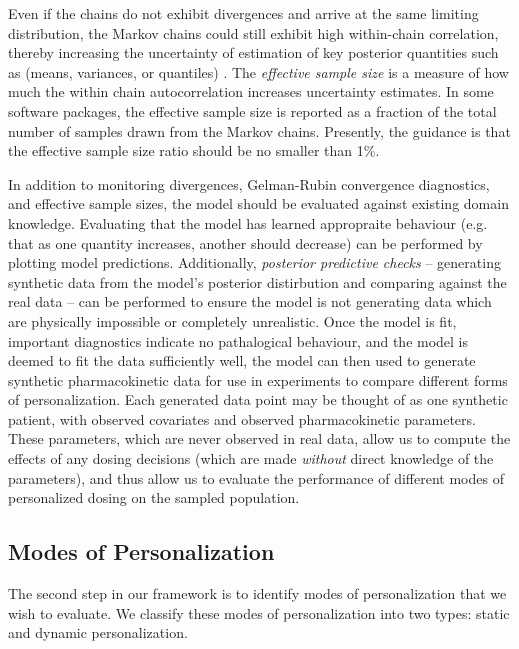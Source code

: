 Even if the chains do not exhibit divergences and arrive at the same limiting distribution, the Markov chains could still exhibit high within-chain correlation, thereby increasing the uncertainty of estimation of key posterior quantities such as (means, variances, or quantiles) \cite{brooks2011handbook}.  The \textit{effective sample size} is a measure of how much the within chain autocorrelation increases uncertainty estimates.  In some software packages, the effective sample size is reported as a fraction of the total number of samples drawn from the Markov chains.  Presently, the guidance is that the effective sample size ratio should be no smaller than 1\%.



In addition to monitoring divergences, Gelman-Rubin convergence diagnostics, and effective sample sizes, the model should be evaluated against existing domain knowledge.  Evaluating that the model has learned appropraite behaviour (e.g. that as one quantity increases, another should decrease) can be performed by plotting model predictions.  Additionally, \textit{posterior predictive checks} -- generating synthetic data  from the model's posterior distirbution and comparing against the real data -- can be performed to ensure the model is not generating data which are physically impossible or completely unrealistic. Once the model is fit, important diagnostics indicate no pathalogical behaviour, and the model is deemed to fit the data sufficiently well, the model can then used to generate synthetic pharmacokinetic data for use in experiments to compare different forms of personalization. Each generated data point may be thought of as one synthetic patient, with observed covariates and observed pharmacokinetic parameters. These parameters, which are never observed in real data, allow us to compute the effects of any dosing decisions (which are made \textit{without} direct knowledge of the parameters), and thus allow us to evaluate the performance of different modes of personalized dosing on the sampled population. 

\subsection{Modes of Personalization}

The second step in our framework is to identify modes of personalization that we wish to evaluate. We classify these modes of personalization into two types: static and dynamic personalization.

